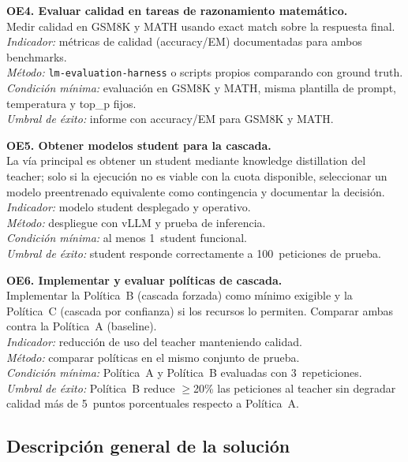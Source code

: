 \documentclass[11pt,a4paper]{article}
\begin{document}
\textbf{OE4. Evaluar calidad en tareas de razonamiento matemático.}\\
Medir calidad en GSM8K y MATH usando exact match sobre la respuesta final.\\
\textit{Indicador:} métricas de calidad (accuracy/EM) documentadas para ambos benchmarks.\\
\textit{Método:} \texttt{lm-evaluation-harness} o scripts propios comparando con ground truth.\\
\textit{Condición mínima:} evaluación en GSM8K y MATH, misma plantilla de prompt, temperatura y top\_p fijos.\\
\textit{Umbral de éxito:} informe con accuracy/EM para GSM8K y MATH.

\textbf{OE5. Obtener modelos student para la cascada.}\\
La vía principal es obtener un student mediante knowledge distillation del teacher; solo si la ejecución no es viable con la cuota disponible, seleccionar un modelo preentrenado equivalente como contingencia y documentar la decisión.\\
\textit{Indicador:} modelo student desplegado y operativo.\\
\textit{Método:} despliegue con vLLM y prueba de inferencia.\\
\textit{Condición mínima:} al menos 1~student funcional.\\
\textit{Umbral de éxito:} student responde correctamente a 100~peticiones de prueba.

\textbf{OE6. Implementar y evaluar políticas de cascada.}\\
Implementar la Política~B (cascada forzada) como mínimo exigible y la Política~C (cascada por confianza) si los recursos lo permiten. Comparar ambas contra la Política~A (baseline).\\
\textit{Indicador:} reducción de uso del teacher manteniendo calidad.\\
\textit{Método:} comparar políticas en el mismo conjunto de prueba.\\
\textit{Condición mínima:} Política~A y Política~B evaluadas con 3~repeticiones.\\
\textit{Umbral de éxito:} Política~B reduce $\geq$20\% las peticiones al teacher sin degradar calidad más de 5~puntos porcentuales respecto a Política~A.

\subsection{Descripción general de la solución}
\end{document}
